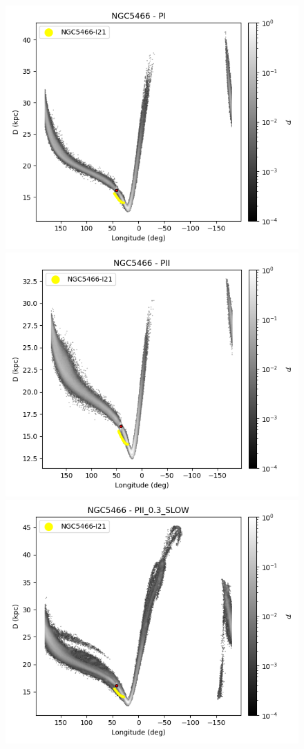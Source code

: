 \begin{figure}
\begin{center}
                    \includegraphics[clip=true, trim = 0mm 0mm 0mm 0mm, width=0.65\columnwidth]{images/PI_individual_NGC5466_galstream-NGC5466-l-distance.png}
                    \includegraphics[clip=true, trim = 0mm 0mm 0mm 0mm, width=0.65\columnwidth]{images/PII_individual_NGC5466_galstream-NGC5466-l-distance.png}
                    \includegraphics[clip=true, trim = 0mm 0mm 0mm 0mm, width=0.65\columnwidth]{images/PII_0.3_SLOW_individual_NGC5466_galstream-NGC5466-l-distance.png}
                \end{center}

\end{figure}

